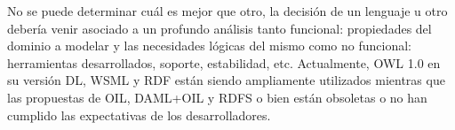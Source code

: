 No se puede determinar cuál es mejor que otro, la decisión de un lenguaje u otro
 debería venir asociado a un profundo análisis tanto funcional: propiedades  del
dominio a modelar y las necesidades lógicas del mismo como no funcional:
herramientas desarrollados, soporte, estabilidad, etc. Actualmente, \gls{OWL} 1.0
en su versión DL, \gls{WSML} y \gls{RDF} están siendo ampliamente utilizados mientras que las
propuestas de \gls{OIL}, \gls{DAML+OIL} y RDFS o bien están obsoletas o no han cumplido
las expectativas de los desarrolladores.


 

